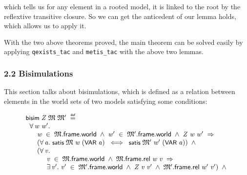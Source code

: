 \documentclass{report}
\renewcommand{\HOLConst}[1]{{\textsf{\upshape\small #1}}}
\newenvironment{holmath}{\begin{displaymath}\begin{array}{l}}{\end{array}\end{displaymath}\ignorespacesafterend}
\begin{document}
which tells us for any element in a rooted model, it is linked to the root by the reflextive transitive closure. So we can get the anticedent of our lemma holds, which allows us to apply it.

With the two above theorems proved, the main theorem can be solved easily by applying \texttt{qexists_tac} and \texttt{metis_tac} with the above two lemmas.

\subsubsection{2.2 Bisimulations}

This section talks about bisimulations, which is defined as a relation between elements in the world sets of two models satisfying some conditions:

\begin{holmath}
  \HOLConst{bisim}\;\HOLFreeVar{Z}\;\HOLFreeVar{\ensuremath{\mathfrak{M}}}\;\HOLFreeVar{\ensuremath{\mathfrak{M}'}}\;\HOLSymConst{\HOLTokenDefEquality{}}\\
\;\;\HOLSymConst{\HOLTokenForall{}}\HOLBoundVar{w}\;\HOLBoundVar{w\sp{\prime}}.\\
\;\;\;\;\;\;\HOLBoundVar{w}\;\HOLSymConst{\HOLTokenIn{}}\;\HOLFreeVar{\ensuremath{\mathfrak{M}}}.\HOLFieldName{frame}.\HOLFieldName{world}\;\HOLSymConst{\HOLTokenConj{}}\;\HOLBoundVar{w\sp{\prime}}\;\HOLSymConst{\HOLTokenIn{}}\;\HOLFreeVar{\ensuremath{\mathfrak{M}'}}.\HOLFieldName{frame}.\HOLFieldName{world}\;\HOLSymConst{\HOLTokenConj{}}\;\HOLFreeVar{Z}\;\HOLBoundVar{w}\;\HOLBoundVar{w\sp{\prime}}\;\HOLSymConst{\HOLTokenImp{}}\\
\;\;\;\;\;\;(\HOLSymConst{\HOLTokenForall{}}\HOLBoundVar{a}.\;\HOLConst{satis}\;\HOLFreeVar{\ensuremath{\mathfrak{M}}}\;\HOLBoundVar{w}\;(\HOLConst{VAR}\;\HOLBoundVar{a})\;\HOLSymConst{\HOLTokenEquiv{}}\;\HOLConst{satis}\;\HOLFreeVar{\ensuremath{\mathfrak{M}'}}\;\HOLBoundVar{w\sp{\prime}}\;(\HOLConst{VAR}\;\HOLBoundVar{a}))\;\HOLSymConst{\HOLTokenConj{}}\\
\;\;\;\;\;\;(\HOLSymConst{\HOLTokenForall{}}\HOLBoundVar{v}.\\
\;\;\;\;\;\;\;\;\;\;\;\HOLBoundVar{v}\;\HOLSymConst{\HOLTokenIn{}}\;\HOLFreeVar{\ensuremath{\mathfrak{M}}}.\HOLFieldName{frame}.\HOLFieldName{world}\;\HOLSymConst{\HOLTokenConj{}}\;\HOLFreeVar{\ensuremath{\mathfrak{M}}}.\HOLFieldName{frame}.\HOLFieldName{rel}\;\HOLBoundVar{w}\;\HOLBoundVar{v}\;\HOLSymConst{\HOLTokenImp{}}\\
\;\;\;\;\;\;\;\;\;\;\;\HOLSymConst{\HOLTokenExists{}}\HOLBoundVar{v\sp{\prime}}.\;\HOLBoundVar{v\sp{\prime}}\;\HOLSymConst{\HOLTokenIn{}}\;\HOLFreeVar{\ensuremath{\mathfrak{M}'}}.\HOLFieldName{frame}.\HOLFieldName{world}\;\HOLSymConst{\HOLTokenConj{}}\;\HOLFreeVar{Z}\;\HOLBoundVar{v}\;\HOLBoundVar{v\sp{\prime}}\;\HOLSymConst{\HOLTokenConj{}}\;\HOLFreeVar{\ensuremath{\mathfrak{M}'}}.\HOLFieldName{frame}.\HOLFieldName{rel}\;\HOLBoundVar{w\sp{\prime}}\;\HOLBoundVar{v\sp{\prime}})\;\HOLSymConst{\HOLTokenConj{}}\\

\end{holmath}
\end{document}
